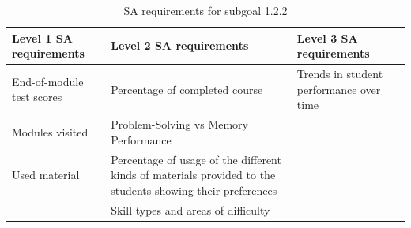 \begin{table}[H]
\begin{center}
\begin{tabular}{ | m{5cm} | m{5cm}| m{5cm} | } 
  \hline
  \textbf{Level 1 SA requirements} & \textbf{Level 2 SA requirements}  & \textbf{Level 3 SA requirements}  \\ 
  \hline
  End-of-module test scores & Percentage of completed course & Trends in student performance over time \\ 
  \hline
  Modules visited & Problem-Solving vs Memory Performance & \\ 
  \hline
  Used material & Percentage of usage of the different kinds of materials provided to the students showing their preferences & \\ 
  \hline
   & Skill types and areas of difficulty & \\ 
  \hline
\end{tabular}
\end{center}
\caption{SA requirements for subgoal 1.2.2}
\end{table}